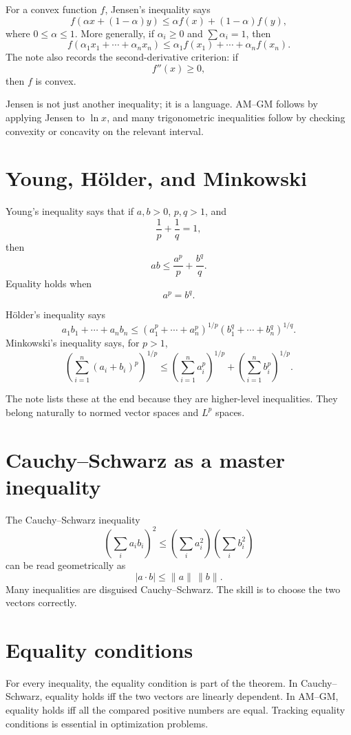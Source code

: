 For a convex function \(f\), Jensen's inequality says
\[
  f(\alpha x+(1-\alpha)y)
  \le \alpha f(x)+(1-\alpha)f(y),
\]
where \(0\le\alpha\le1\).  More generally, if \(\alpha_i\ge0\) and \(\sum\alpha_i=1\), then
\[
  f(\alpha_1x_1+\cdots+\alpha_nx_n)
  \le
  \alpha_1f(x_1)+\cdots+\alpha_nf(x_n).
\]
The note also records the second-derivative criterion: if
\[
  f''(x)\ge0,
\]
then \(f\) is convex.

Jensen is not just another inequality; it is a language.  AM--GM follows by applying Jensen to \(\ln x\), and many trigonometric inequalities follow by checking convexity or concavity on the relevant interval.

\section{Young, Hölder, and Minkowski}

Young's inequality says that if \(a,b>0\), \(p,q>1\), and
\[
  \frac1p+\frac1q=1,
\]
then
\[
  ab\le\frac{a^p}{p}+\frac{b^q}{q}.
\]
Equality holds when
\[
  a^p=b^q.
\]

Hölder's inequality says
\[
  a_1b_1+\cdots+a_nb_n
  \le
  \left(a_1^p+\cdots+a_n^p\right)^{1/p}
  \left(b_1^q+\cdots+b_n^q\right)^{1/q}.
\]
Minkowski's inequality says, for \(p>1\),
\[
  \left(\sum_{i=1}^n(a_i+b_i)^p\right)^{1/p}
  \le
  \left(\sum_{i=1}^n a_i^p\right)^{1/p}
  +
  \left(\sum_{i=1}^n b_i^p\right)^{1/p}.
\]

The note lists these at the end because they are higher-level inequalities.  They belong naturally to normed vector spaces and \(L^p\) spaces.


\section{Cauchy--Schwarz as a master inequality}

The Cauchy--Schwarz inequality
\[
  \left(\sum_i a_i b_i\right)^2\le\left(\sum_i a_i^2\right)\left(\sum_i b_i^2\right)
\]
can be read geometrically as
\[
  |a\cdot b|\le \|a\|\,\|b\|.
\]
Many inequalities are disguised Cauchy--Schwarz.  The skill is to choose the two vectors correctly.

\section{Equality conditions}

For every inequality, the equality condition is part of the theorem.  In Cauchy--Schwarz, equality holds iff the two vectors are linearly dependent.  In AM--GM, equality holds iff all the compared positive numbers are equal.  Tracking equality conditions is essential in optimization problems.

